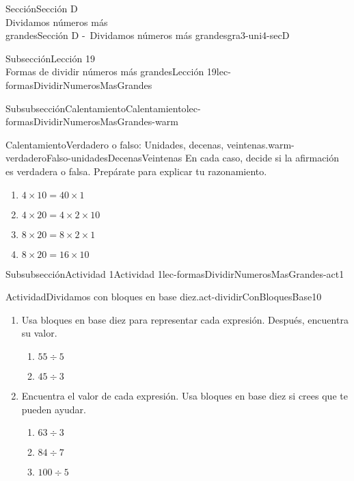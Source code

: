 \begin{sectionptx}{Sección}{{\Large Sección D\\}Dividamos números más\\grandes}{}{Sección D -~Dividamos números más grandes}{}{}{gra3-uni4-secD}
\begin{subsectionptx}{Subsección}{{\normalsize Lección 19\\[-0.05cm]}Formas de dividir números más grandes}{}{Lección 19}{}{}{lec-formasDividirNumerosMasGrandes}
\begin{subsubsectionptx}{Subsubsección}{Calentamiento}{}{Calentamiento}{}{}{lec-formasDividirNumerosMasGrandes-warm}
\begin{exploration}{Calentamiento}{Verdadero o falso: Unidades, decenas, veintenas.}{warm-verdaderoFalso-unidadesDecenasVeintenas}%
En cada caso, decide si la afirmación es verdadera o falsa. Prepárate para explicar tu razonamiento.%
%
\begin{enumerate}[label={\Alph*.}]
\item{}\(\displaystyle 4 \times 10 = 40 \times 1\)%
\item{}\(\displaystyle 4 \times 20 = 4 \times 2 \times 10\)%
\item{}\(\displaystyle 8 \times 20 = 8 \times 2 \times 1\)%
\item{}\(\displaystyle 8 \times 20 = 16 \times 10\)%
\end{enumerate}
\end{exploration}%
\end{subsubsectionptx}
%
%
\typeout{************************************************}
\typeout{************************************************}
%
\begin{subsubsectionptx}{Subsubsección}{Actividad 1}{}{Actividad 1}{}{}{lec-formasDividirNumerosMasGrandes-act1}
\begin{activity}{Actividad}{Dividamos con bloques en base diez.}{act-dividirConBloquesBase10}%
\begin{sidebyside}{2}{0}{0}{0.1}%
\begin{sbspanel}{0.7}%
%
\begin{enumerate}
\item{}Usa bloques en base diez para representar cada expresión. Después, encuentra su valor.%
%
\begin{enumerate}
\item{}\(\displaystyle 55 \div 5\)%
\item{}\(\displaystyle 45 \div 3\)%
\end{enumerate}
\item{}Encuentra el valor de cada expresión. Usa bloques en base diez si crees que te pueden ayudar.%
%
\begin{enumerate}
\item{}\(\displaystyle 63 \div 3\)%
\item{}\(\displaystyle 84 \div 7\)%
\item{}\(\displaystyle 100 \div 5\)%
\end{enumerate}
\end{enumerate}
\end{sbspanel}%
\begin{sbspanel}{0.2}%

\end{sbspanel}
\end{sidebyside}
\end{activity}
\end{subsubsectionptx}
\end{subsectionptx}
\end{sectionptx}
